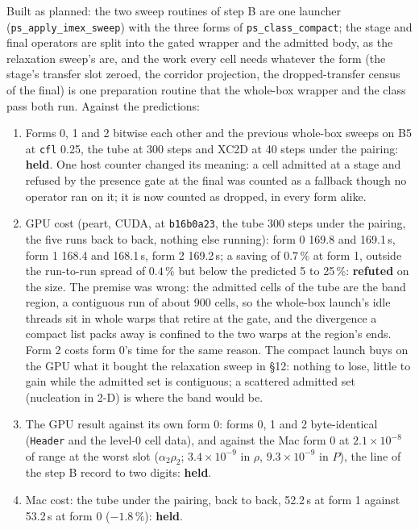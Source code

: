 \documentclass[11pt,a4paper]{article}
\newcommand{\code}[1]{\texttt{\small #1}}
\begin{document}
Built as planned: the two sweep routines of step B are one launcher
(\code{ps\_apply\_imex\_sweep}) with the three forms of
\code{ps\_class\_compact}; the stage and final operators are split into
the gated wrapper and the admitted body, as the relaxation sweep's are,
and the work every cell needs whatever the form (the stage's transfer
slot zeroed, the corridor projection, the dropped-transfer census of the
final) is one preparation routine that the whole-box wrapper and the
class pass both run.  Against the predictions:
\begin{enumerate}[nosep]
\item Forms 0, 1 and 2 bitwise each other and the previous whole-box
      sweeps on B5 at \code{cfl} 0.25, the tube at 300 steps and XC2D at
      40 steps under the pairing: \textbf{held}.  One host counter
      changed its meaning: a cell admitted at a stage and refused by the
      presence gate at the final was counted as a fallback though no
      operator ran on it; it is now counted as dropped, in every form
      alike.
\item GPU cost (peart, CUDA, at \code{b16b0a23}, the tube 300 steps
      under the pairing, the five runs back to back, nothing else
      running): form 0 169.8 and 169.1\,s, form 1 168.4 and 168.1\,s,
      form 2 169.2\,s; a saving of $0.7\,\%$ at form 1, outside the
      run-to-run spread of $0.4\,\%$ but below the predicted 5 to
      25\,\%: \textbf{refuted} on the size.  The premise was wrong: the
      admitted cells of the tube are the band region, a contiguous run
      of about 900 cells, so the whole-box launch's idle threads sit in
      whole warps that retire at the gate, and the divergence a compact
      list packs away is confined to the two warps at the region's
      ends.  Form 2 costs form 0's time for the same reason.  The
      compact launch buys on the GPU what it bought the relaxation sweep
      in \S12: nothing to lose, little to gain while the admitted set is
      contiguous; a scattered admitted set (nucleation in 2-D) is where
      the band would be.
\item The GPU result against its own form 0: forms 0, 1 and 2
      byte-identical (\code{Header} and the level-0 cell data), and
      against the Mac form 0 at $2.1\times10^{-8}$ of range at the worst
      slot ($\alpha_2\rho_2$; $3.4\times10^{-9}$ in $\rho$,
      $9.3\times10^{-9}$ in $P$), the line of the step B record to two
      digits: \textbf{held}.
\item Mac cost: the tube under the pairing, back to back, 52.2\,s at
      form 1 against 53.2\,s at form 0 ($-1.8\,\%$): \textbf{held}.
\end{enumerate}
\end{document}
